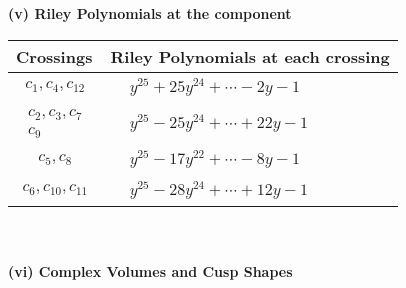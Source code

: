 \documentclass[1p]{elsarticle_modified}
\theoremstyle{definition}
\begin{document}
\newpage\renewcommand{\arraystretch}{1}
\flushleft \textbf{(v) Riley Polynomials at the component}\newline \\
\begin{tabular}{m{50pt}|m{274pt}}
Crossings & \hspace{64pt}Riley Polynomials at each crossing \\
\hline $$\begin{aligned}c_{1},c_{4},c_{12}\end{aligned}$$&$\begin{aligned}
&y^{25}+25 y^{24}+\cdots-2 y-1
\end{aligned}$\\
\hline $$\begin{aligned}c_{2},c_{3},c_{7}\\c_{9}\end{aligned}$$&$\begin{aligned}
&y^{25}-25 y^{24}+\cdots+22 y-1
\end{aligned}$\\
\hline $$\begin{aligned}c_{5},c_{8}\end{aligned}$$&$\begin{aligned}
&y^{25}-17 y^{22}+\cdots-8 y-1
\end{aligned}$\\
\hline $$\begin{aligned}c_{6},c_{10},c_{11}\end{aligned}$$&$\begin{aligned}
&y^{25}-28 y^{24}+\cdots+12 y-1
\end{aligned}$\\
\hline
\end{tabular}\\~\\
\newpage\flushleft \textbf{(vi) Complex Volumes and Cusp Shapes}
\end{document}
